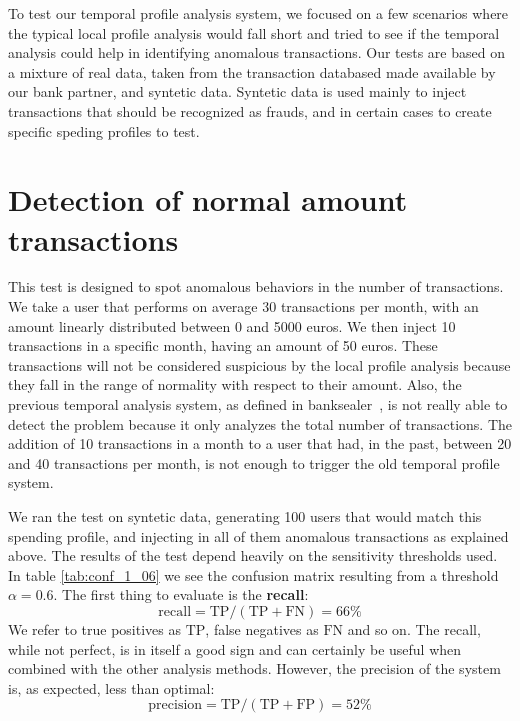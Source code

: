 

To test our temporal profile analysis system, we focused on a few scenarios where the typical local profile analysis would fall short and tried to see if the temporal analysis could help in identifying anomalous transactions. Our tests are based on a mixture of real data, taken from the transaction databased made available by our bank partner, and syntetic data. Syntetic data is used mainly to inject transactions that should be recognized as frauds, and in certain cases to create specific speding profiles to test.

\section{Detection of normal amount transactions}

This test is designed to spot anomalous behaviors in the number of transactions. We take a user that performs on average 30 transactions per month, with an amount linearly distributed between 0 and 5000 euros. We then inject 10 transactions in a specific month, having an amount of 50 euros. These transactions will not be considered suspicious by the local profile analysis because they fall in the range of normality with respect to their amount. Also, the previous temporal analysis system, as defined in banksealer~\cite{banksealer}, is not really able to detect the problem because it only analyzes the total number of transactions. The addition of 10 transactions in a month to a user that had, in the past, between 20 and 40 transactions per month, is not enough to trigger the old temporal profile system.

We ran the test on syntetic data, generating 100 users that would match this spending profile, and injecting in all of them anomalous transactions as explained above. The results of the test depend heavily on the sensitivity thresholds used. In table \ref{tab:conf_1_06} we see the confusion matrix resulting from a threshold $\alpha = 0.6$. The first thing to evaluate is the \textbf{recall}:
\begin{displaymath}
\text{recall} = \text{TP} / (\text{TP} + \text{FN}) = 66\%
\end{displaymath}
We refer to true positives as $\text{TP}$, false negatives as $\text{FN}$ and so on.
The recall, while not perfect, is in itself a good sign and can certainly be useful when combined with the other analysis methods. However, the precision of the system is, as expected, less than optimal:
\begin{displaymath}
\text{precision} = \text{TP} / (\text{TP} + \text{FP}) = 52\%
\end{displaymath}

